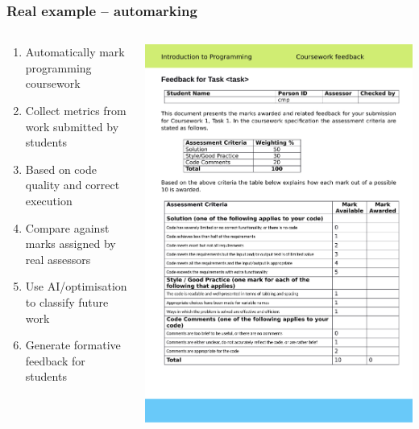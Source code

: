 \documentclass[handout, notes=hide]{beamer}
\begin{document}
\begin{frame}[fragile]
\frametitle{Real example -- automarking}
\setlength{\parskip}{0.5em}

\begin{columns}[T]
\begin{column}[T]{0.5\textwidth}
\setlength{\parskip}{0.7em}

\begin{enumerate}
\item Automatically mark programming coursework
\item Collect metrics from work submitted by students
\item Based on code quality and correct execution
\item Compare against marks assigned by real assessors
\item Use AI/optimisation to classify future work
\item Generate formative feedback for students
\end{enumerate}

\end{column}
\begin{column}[T]{0.5\textwidth}
\vspace{-0.5em}

\includegraphics[width=1.0\textwidth]{feedback}
\end{column}
\end{columns}


\end{frame}
\note{
\setlength{\parskip}{0.5em}
}
\end{document}
